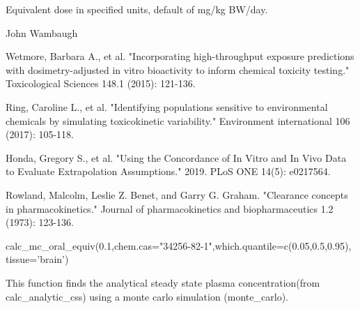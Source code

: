 \documentclass[a4paper]{book}
\begin{document}
%
\begin{Value}
Equivalent dose in specified units, default of mg/kg BW/day.
\end{Value}
%
\begin{Author}\relax
John Wambaugh
\end{Author}
%
\begin{References}\relax
Wetmore, Barbara A., et al. "Incorporating high-throughput 
exposure predictions with dosimetry-adjusted in vitro bioactivity to inform 
chemical toxicity testing." Toxicological Sciences 148.1 (2015): 121-136.

Ring, Caroline L., et al. "Identifying populations sensitive to
environmental chemicals by simulating toxicokinetic variability."
Environment international 106 (2017): 105-118. 

Honda, Gregory S., et al. "Using the Concordance of In Vitro and 
In Vivo Data to Evaluate Extrapolation Assumptions." 2019. PLoS ONE 14(5): e0217564.

Rowland, Malcolm, Leslie Z. Benet, and Garry G. Graham. "Clearance concepts in 
pharmacokinetics." Journal of pharmacokinetics and biopharmaceutics 1.2 (1973): 123-136.
\end{References}
%
\begin{Examples}
\begin{ExampleCode}



calc_mc_oral_equiv(0.1,chem.cas="34256-82-1",which.quantile=c(0.05,0.5,0.95),
       tissue='brain')


\end{ExampleCode}
\end{Examples}
%
\begin{Description}\relax
This function finds the analytical steady state plasma concentration(from
calc\_analytic\_css) using a monte carlo simulation (monte\_carlo).
\end{Description}
%
\end{document}
